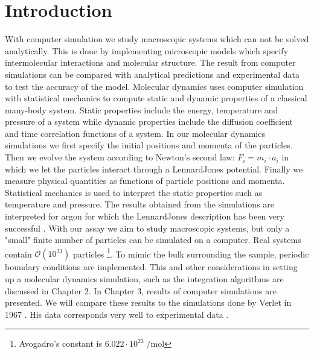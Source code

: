 \documentclass{article}
\begin{document}
\section{Introduction}
With computer simulation we study macroscopic systems which can not be solved analytically. This is done by implementing microscopic models which specify intermolecular interactions and molecular structure.
The result from computer simulations can be compared with analytical predictions and experimental data to test the accuracy of the model. Molecular dynamics uses computer simulation with statistical mechanics to compute static and dynamic properties of a classical many-body system. Static properties include the energy, temperature and pressure of a system while dynamic properties include the diffusion coefficient and time correlation functions of a system. In our molecular dynamics simulations we first specify the initial positions and momenta of the particles. Then we evolve the system according to Newton’s second law: $ F_{i} = m_{i} \cdot a_{i}$ in which we let the particles interact through a Lennard\text{-}Jones potential.
Finally we measure physical quantities as functions of particle positions and momenta.
Statistical mechanics is used to interpret the static properties such as temperature and pressure.
The results obtained from the simulations are interpreted for argon for which the Lennard\text{-}Jones description has been very successful \citep{PhysRev.136.A405}.
With our assay we aim to study macroscopic systems, but only a "small" finite number of particles can be simulated on a computer.
Real systems contain $\mathcal{O}(10^{23})$ particles \footnote{Avogadro's constant is $6.022\cdot 10^{23} \; \si{\per\mole}$}. 
To mimic the bulk surrounding the sample, periodic boundary conditions are implemented.
This and other considerations in setting up a molecular dynamics simulation, such as the integration algorithms are discussed in Chapter 2. 
In Chapter 3, results of computer simulations are presented. 
We will compare these results to the simulations done by Verlet in 1967 \citep{PhysRev.159.98}. His data corresponds very well to experimental data \citep{Levelt1960361, VanItterbeek1963742, Michels1949627}.
\end{document}
